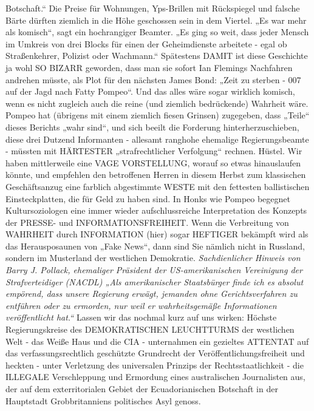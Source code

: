 \begin{multicols}{2}
{Botschaft.“ Die Preise für Wohnungen, Yps-Brillen mit
Rückspiegel und falsche Bärte dürften ziemlich in die
Höhe geschossen sein in dem Viertel. „Es war mehr als
komisch“, sagt ein hochrangiger Beamter. „Es ging so
weit, dass jeder Mensch im Umkreis von drei Blocks für
einen der Geheimdienste arbeitete - egal ob Straßenkehrer, Polizist oder Wachmann.“\textCR
Spätestens DAMIT ist diese Geschichte ja wohl SO BIZARR geworden, dass man sie sofort Ian Flemings Nachfahren andrehen müsste, als Plot für den nächsten James
Bond: „Zeit zu sterben - 007 auf der Jagd nach Fatty Pompeo“. Und das alles wäre sogar wirklich komisch, wenn
es nicht zugleich auch die reine (und ziemlich bedrückende) Wahrheit wäre.\textCR
Pompeo hat (übrigens mit einem ziemlich fiesen Grinsen) zugegeben, dass „Teile“ dieses Berichts „wahr sind“,
und sich beeilt die Forderung hinterherzuschieben,
diese drei Dutzend Informanten - allesamt ranghohe
ehemalige Regierungsbeamte - müssten mit HÄRTESTER „strafrechtlicher Verfolgung“ rechnen. Hüstel. Wir
haben mittlerweile eine VAGE VORSTELLUNG, worauf
so etwas hinauslaufen könnte, und empfehlen den betroffenen Herren in diesem Herbst zum klassischen Geschäftsanzug eine farblich abgestimmte WESTE mit den
fettesten ballistischen Einsteckplatten, die für Geld zu
haben sind.\textCR
In Honks wie Pompeo begegnet Kultursoziologen eine
immer wieder aufschlussreiche Interpretation des Konzepts der PRESSE- und INFORMATIONSFREIHEIT.
Wenn die Verbreitung von WAHRHEIT durch INFORMATION (hier) sogar HEFTIGER bekämpft wird als das
Herausposaunen von „Fake News“, dann sind Sie nämlich nicht in Russland, sondern im Musterland der westlichen Demokratie.\textCR
\textit{Sachdienlicher Hinweis von Barry J. Pollack, ehemaliger
Präsident der US-amerikanischen Vereinigung der Strafverteidiger (NACDL)
„Als amerikanischer Staatsbürger finde ich es absolut empörend, dass unsere Regierung erwägt, jemanden ohne
Gerichtsverfahren zu entführen oder zu ermorden, nur
weil er wahrheitsgemäße Informationen veröffentlicht hat.“}\textCR
Lassen wir das nochmal kurz auf uns wirken: Höchste
Regierungskreise des DEMOKRATISCHEN LEUCHTTURMS der westlichen Welt - das Weiße Haus und die
CIA - unternahmen ein gezieltes ATTENTAT auf das
verfassungsrechtlich geschützte Grundrecht der Veröffentlichungsfreiheit und heckten - unter Verletzung
des universalen Prinzips der Rechtsstaatlichkeit - die
ILLEGALE Verschleppung und Ermordung eines australischen Journalisten aus, der auf dem exterritorialen Gebiet der Ecuadorianischen Botschaft in der Hauptstadt
Grobbritanniens politisches Asyl genoss.\textCR
}
\end{multicols}
